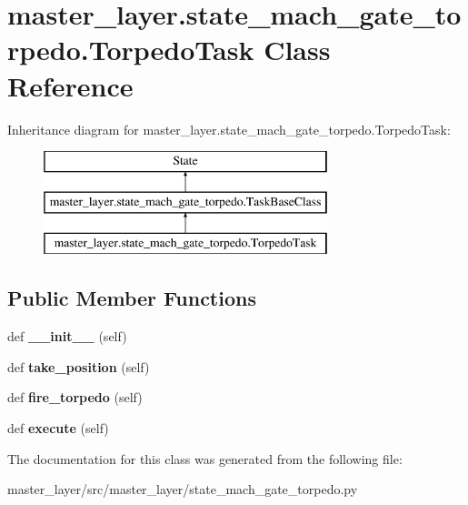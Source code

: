 \hypertarget{classmaster__layer_1_1state__mach__gate__torpedo_1_1TorpedoTask}{}\section{master\+\_\+layer.\+state\+\_\+mach\+\_\+gate\+\_\+torpedo.\+Torpedo\+Task Class Reference}
\label{classmaster__layer_1_1state__mach__gate__torpedo_1_1TorpedoTask}
Inheritance diagram for master\+\_\+layer.\+state\+\_\+mach\+\_\+gate\+\_\+torpedo.\+Torpedo\+Task\+:\begin{figure}[H]
\begin{center}
\leavevmode
\includegraphics[height=3.000000cm]{classmaster__layer_1_1state__mach__gate__torpedo_1_1TorpedoTask}
\end{center}
\end{figure}
\subsection*{Public Member Functions}
\begin{DoxyCompactItemize}
\item 
\mbox{\label{classmaster__layer_1_1state__mach__gate__torpedo_1_1TorpedoTask_afdf0a524f9236fc735a0a2989b7d9fde}} 
def {\bfseries \+\_\+\+\_\+init\+\_\+\+\_\+} (self)
\item 
\mbox{\label{classmaster__layer_1_1state__mach__gate__torpedo_1_1TorpedoTask_a4e3b86be9f59cd0300494d6a82d3ea69}} 
def {\bfseries take\+\_\+position} (self)
\item 
\mbox{\label{classmaster__layer_1_1state__mach__gate__torpedo_1_1TorpedoTask_a97d14baf0a6ac317ee8296dd5db3aee6}} 
def {\bfseries fire\+\_\+torpedo} (self)
\item 
\mbox{\label{classmaster__layer_1_1state__mach__gate__torpedo_1_1TorpedoTask_a7e2f286f66971e8348be03e7c99ccd7e}} 
def {\bfseries execute} (self)
\end{DoxyCompactItemize}


The documentation for this class was generated from the following file\+:\begin{DoxyCompactItemize}
\item 
master\+\_\+layer/src/master\+\_\+layer/state\+\_\+mach\+\_\+gate\+\_\+torpedo.\+py\end{DoxyCompactItemize}
